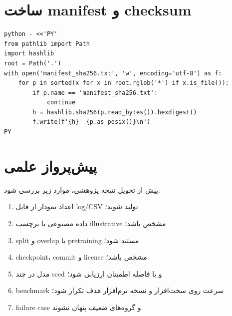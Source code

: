 \documentclass[12pt,openany,oneside]{book}
\begin{document}
\section{ساخت manifest و checksum}
\begin{latin}
\begin{lstlisting}
python - <<'PY'
from pathlib import Path
import hashlib
root = Path('.')
with open('manifest_sha256.txt', 'w', encoding='utf-8') as f:
    for p in sorted(x for x in root.rglob('*') if x.is_file()):
        if p.name == 'manifest_sha256.txt':
            continue
        h = hashlib.sha256(p.read_bytes()).hexdigest()
        f.write(f'{h}  {p.as_posix()}\n')
PY
\end{lstlisting}
\end{latin}

\section{پیش‌پرواز علمی}
پیش از تحویل نتیجه پژوهشی، موارد زیر بررسی شود:
\begin{enumerate}
\item اعداد نمودار از فایل log/CSV تولید شوند؛
\item داده مصنوعی با برچسب illustrative مشخص باشد؛
\item split و overlap با pretraining مستند شود؛
\item checkpoint، commit و license مشخص باشد؛
\item مدل در چند seed و با فاصله اطمینان ارزیابی شود؛
\item benchmark سرعت روی سخت‌افزار و نسخه نرم‌افزار هدف تکرار شود؛
\item failure case و گروه‌های ضعیف پنهان نشوند.
\end{enumerate}
\end{document}

